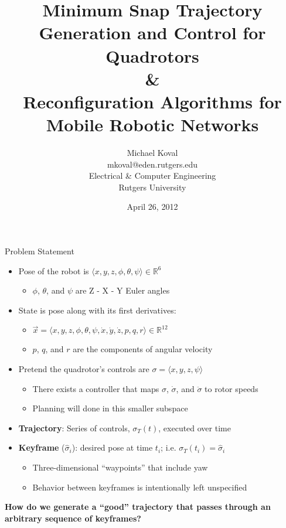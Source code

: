 \documentclass[onlymath]{beamer}
\title{
    Minimum Snap Trajectory Generation and Control for Quadrotors \\
    \& \\
    Reconfiguration Algorithms for Mobile Robotic Networks
}
\author{
    Michael Koval \\
    mkoval@eden.rutgers.edu \\
    Electrical \& Computer Engineering \\
    Rutgers University
}
\date{April 26, 2012}
\begin{document}
\begin{frame}
\titlepage
\end{frame}

\begin{frame}{Problem Statement}
    \begin{itemize}
    \item Pose of the robot is $\langle x, y, z, \phi, \theta, \psi \rangle \in
          \mathbb{R}^6$
        \begin{itemize}
        \item $\phi$, $\theta$, and $\psi$ are Z - X - Y Euler angles
        \end{itemize}
    \item State is pose along with its first derivatives:
        \begin{itemize}
        \item $\vec{x} = \langle x, y, z, \phi, \theta, \psi, \dot{x}, \dot{y},
              \dot{z}, p , q, r \rangle \in \mathbb{R}^{12}$
        \item $p$, $q$, and $r$ are the components of angular velocity
        \end{itemize}
    \item Pretend the quadrotor's controls are $\sigma = \langle x, y, z, \psi \rangle$
        \begin{itemize}
        \item There exists a controller that maps $\sigma$, $\dot{\sigma}$, and
              $\ddot{\sigma}$ to rotor speeds
        \item Planning will done in this smaller subspace
        \end{itemize}
    \item \textbf{Trajectory}: Series of controls, $\sigma_T(t)$, executed over time
    \item \textbf{Keyframe} ($\hat{\sigma}_i$): desired pose at time $t_i$;
          i.e. $\sigma_T(t_i) = \hat{\sigma}_i$
        \begin{itemize}
        \item Three-dimensional ``waypoints'' that include yaw
        \item Behavior between keyframes is intentionally left unspecified
        \end{itemize}
    \end{itemize}
\begin{center}
    \textbf{How do we generate a ``good'' trajectory that passes through an
            arbitrary sequence of keyframes?}
\end{center}
\end{frame}
\end{document}
